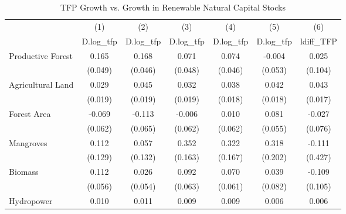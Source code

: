 \begin{table}[htbp]\centering
\def\sym#1{\ifmmode^{#1}\else\(^{#1}\)\fi}
\caption{TFP Growth vs. Growth in Renewable Natural Capital Stocks}
\begin{tabular}{l*{6}{c}}
\hline\hline
                    &\multicolumn{1}{c}{(1)}&\multicolumn{1}{c}{(2)}&\multicolumn{1}{c}{(3)}&\multicolumn{1}{c}{(4)}&\multicolumn{1}{c}{(5)}&\multicolumn{1}{c}{(6)}\\
                    &\multicolumn{1}{c}{D.log\_tfp}&\multicolumn{1}{c}{D.log\_tfp}&\multicolumn{1}{c}{D.log\_tfp}&\multicolumn{1}{c}{D.log\_tfp}&\multicolumn{1}{c}{D.log\_tfp}&\multicolumn{1}{c}{ldiff\_TFP}\\
\hline
Productive Forest   &       0.165       &       0.168       &       0.071       &       0.074       &      -0.004       &       0.025       \\
                    &     (0.049)       &     (0.046)       &     (0.048)       &     (0.046)       &     (0.053)       &     (0.104)       \\
[1em]
Agricultural Land   &       0.029       &       0.045       &       0.032       &       0.038       &       0.042       &       0.043       \\
                    &     (0.019)       &     (0.019)       &     (0.019)       &     (0.018)       &     (0.018)       &     (0.017)       \\
[1em]
Forest Area         &      -0.069       &      -0.113       &      -0.006       &       0.010       &       0.081       &      -0.027       \\
                    &     (0.062)       &     (0.065)       &     (0.062)       &     (0.062)       &     (0.055)       &     (0.076)       \\
[1em]
Mangroves           &       0.112       &       0.057       &       0.352       &       0.322       &       0.318       &      -0.111       \\
                    &     (0.129)       &     (0.132)       &     (0.163)       &     (0.167)       &     (0.202)       &     (0.427)       \\
[1em]
Biomass             &       0.112       &       0.026       &       0.092       &       0.070       &       0.039       &      -0.109       \\
                    &     (0.056)       &     (0.054)       &     (0.063)       &     (0.061)       &     (0.082)       &     (0.105)       \\
[1em]
Hydropower          &       0.010       &       0.011       &       0.009       &       0.009       &       0.006       &       0.006       \\

\end{tabular}
\end{table}
